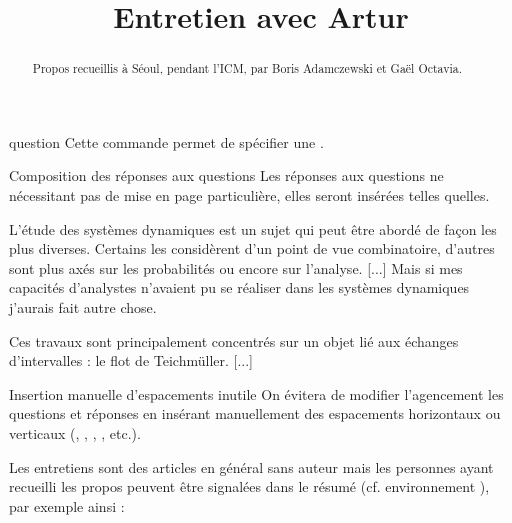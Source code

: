 \begin{docCommand}{question}{}
  Cette commande permet de spécifier une .
\end{docCommand}

\begin{dbremark}{Composition des réponses aux questions}{}
  Les réponses aux questions ne nécessitant pas de mise en page particulière,
  elles seront insérées telles quelles.
\end{dbremark}

\begin{bodycode}

L'étude des systèmes dynamiques est un sujet qui peut être abordé de façon les
plus diverses.  Certains les considèrent d'un point de vue combinatoire,
d'autres sont plus axés sur les probabilités ou encore sur l'analyse. [...]
Mais si mes capacités d'analystes n'avaient pu se réaliser dans les systèmes
dynamiques j'aurais fait autre chose.


Ces travaux sont principalement concentrés sur un objet lié aux échanges
d'intervalles : le flot de Teichmüller. [...]
\end{bodycode}

\begin{dbwarning}{Insertion manuelle d'espacements inutile}{}
  On évitera de modifier l'agencement les questions et réponses en insérant
  manuellement des espacements horizontaux ou verticaux
  (, , ,
  , etc.).
\end{dbwarning}

Les entretiens sont des articles en général sans auteur mais les personnes ayant
recueilli les propos peuvent être signalées dans le résumé (cf. environnement
), par exemple ainsi :

\begin{bodycode}
\title{Entretien avec Artur }
\begin{abstract}
  Propos recueillis à Séoul, pendant l'ICM, par Boris Adamczewski et Gaël
  Octavia.
\end{abstract}
\maketitle
\end{bodycode}

